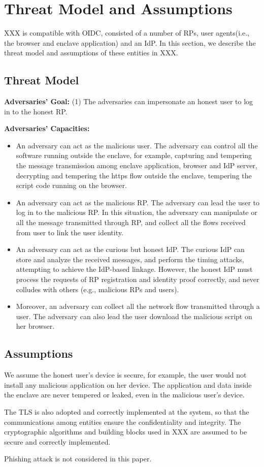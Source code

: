 \section{Threat Model and Assumptions}
\label{sec:threatmodel}
XXX is compatible with OIDC, consisted of a number of RPs, user agents(i.e., the browser and enclave application) and an IdP. In this section, we describe the threat model and assumptions of these entities in XXX.
\subsection{Threat Model}
\noindent\textbf{Adversaries' Goal: } (1) The adversaries can impersonate an honest user to log in to the honest RP.

\noindent\textbf{Adversaries' Capacities: }
\begin{itemize}
\item An adversary can act as the malicious user. The adversary can control all the software running outside the enclave, for example, capturing and tempering the message transmission among enclave application, browser and IdP server, decrypting and tempering the https flow outside the enclave, tempering the script code running on the browser.
\item An adversary can act as the malicious RP. The adversary can lead the user to log in to the malicious RP. In this situation, the adversary can manipulate or all the message transmitted through RP, and collect all the flows received from user to link the user identity.
\item An adversary can act as the curious but honest IdP. The curious IdP can store and analyze the received messages, and perform the timing attacks, attempting to achieve the IdP-based linkage. However, the honest IdP must process the requests of RP registration and identity proof correctly, and never colludes with others (e.g., malicious RPs and users).
\item Moreover, an adversary can collect all the network flow transmitted through a user. The adversary can also lead the user download the malicious script on her browser.
\end{itemize}

\subsection{Assumptions}
We assume the honest user's device is secure, for example, the user would not install any malicious application on her device. The application and data inside the enclave are never tempered or leaked, even in the malicious user's device.

The TLS is also adopted and correctly implemented at the system, so that the communications among entities ensure the confidentiality and integrity.
The cryptographic algorithms and building blocks used in XXX are assumed to be secure and correctly implemented. 

Phishing attack is not considered in this paper.

